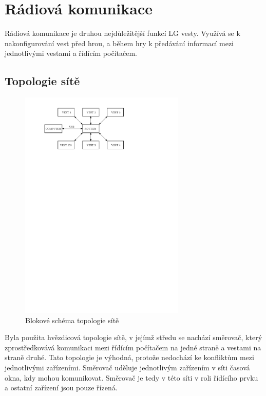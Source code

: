 \chapter{Rádiová komunikace}
Rádiová komunikace je druhou nejdůležitější funkcí LG vesty. Využívá se k nakonfigurování vest před hrou, a během hry k předávání informací mezi jednotlivými vestami a řídícím počítačem.

\section{Topologie sítě}
\begin{figure}[H]
    \begin{center}
        \includegraphics[width=0.7\textwidth]{img/rf-network}
    \end{center}
    \caption{Blokové schéma topologie sítě}
\end{figure}
Byla použita hvězdicová topologie sítě, v jejímž středu se nachází směrovač, který zprostředkovává komunikaci mezi řídícím počítačem na jedné straně a vestami na straně druhé. Tato topologie je výhodná, protože nedochází ke konfliktům mezi jednotlivými zařízeními. Směrovač uděluje jednotlivým zařízením v síti časová okna, kdy mohou komunikovat. Směrovač je tedy v této síti v roli řídícího prvku a ostatní zařízení jsou pouze řízená.

